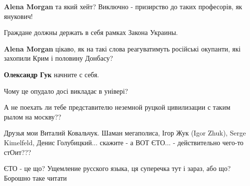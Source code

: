 \begin{itemize}
\begin{itemize}
\textbf{Alena Morgan} та який хейт? Виключно - призирство до таких професорів, як янукович!

 
Граждане должны держать в себя рамках Закона Украины.

 
\textbf{Alena Morgan} цікаво, як на такі слова реагуватимуть російські окупанти, які захопили Крим і половину Донбасу?

 
\textbf{Олександр Гук} начните с себя.
\end{itemize}

 
Чому це опудало досі викладає в універі?

 
А не поехать ли тебе представителю неземной руцкой цивилизации с таким рылом на москву??

 
Друзья мои Виталий Ковальчук. Шаман мегаполиса, Ігор Жук (Igor Zhuk), Serge Kimelfeld, Денис Голубицкий...
скажите - а ВОТ ЄТО... - действительно чего-то стОит???

\begin{itemize}
 
ЄТО - це що?
Ущемление русского языка, ця суперечка тут і зараз, або що?
Борошно таке читати \Smiley[1.0][yellow]

 

\end{itemize}
\end{itemize}
